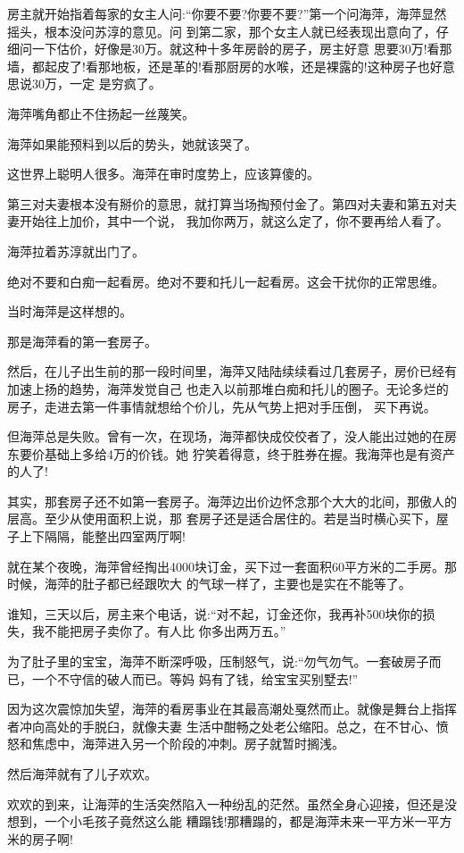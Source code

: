 \documentclass[11pt,a4paper,onecolumn]{article}
\begin{document}
房主就开始指着每家的女主人问:``你要不要?你要不要?''第一个问海萍，海萍显然摇头，根本没问苏淳的意见。问
到第二家，那个女主人就已经表现出意向了，仔细问一下估价，好像是30万。就这种十多年房龄的房子，房主好意
思要30万!看那墙，都起皮了!看那地板，还是革的!看那厨房的水喉，还是裸露的!这种房子也好意思说30万，一定
是穷疯了。

海萍嘴角都止不住扬起一丝蔑笑。

海萍如果能预料到以后的势头，她就该哭了。

这世界上聪明人很多。海萍在审时度势上，应该算傻的。

第三对夫妻根本没有掰价的意思，就打算当场掏预付金了。第四对夫妻和第五对夫妻开始往上加价，其中一个说，
我加你两万，就这么定了，你不要再给人看了。

海萍拉着苏淳就出门了。

绝对不要和白痴一起看房。绝对不要和托儿一起看房。这会干扰你的正常思维。

当时海萍是这样想的。

那是海萍看的第一套房子。

然后，在儿子出生前的那一段时间里，海萍又陆陆续续看过几套房子，房价已经有加速上扬的趋势，海萍发觉自己
也走入以前那堆白痴和托儿的圈子。无论多烂的房子，走进去第一件事情就想给个价儿，先从气势上把对手压倒，
买下再说。

但海萍总是失败。曾有一次，在现场，海萍都快成佼佼者了，没人能出过她的在房东要价基础上多给4万的价钱。她
狞笑着得意，终于胜券在握。我海萍也是有资产的人了!

其实，那套房子还不如第一套房子。海萍边出价边怀念那个大大的北间，那傲人的层高。至少从使用面积上说，那
套房子还是适合居住的。若是当时横心买下，屋子上下隔隔，能整出四室两厅啊!

就在某个夜晚，海萍曾经掏出4000块订金，买下过一套面积60平方米的二手房。那时候，海萍的肚子都已经跟吹大
的气球一样了，主要也是实在不能等了。

谁知，三天以后，房主来个电话，说:``对不起，订金还你，我再补500块你的损失，我不能把房子卖你了。有人比
你多出两万五。''

为了肚子里的宝宝，海萍不断深呼吸，压制怒气，说:``勿气勿气。一套破房子而已，一个不守信的破人而已。等妈
妈有了钱，给宝宝买别墅去!''

因为这次震惊加失望，海萍的看房事业在其最高潮处戛然而止。就像是舞台上指挥者冲向高处的手脱臼，就像夫妻
生活中酣畅之处老公缩阳。总之，在不甘心、愤怒和焦虑中，海萍进入另一个阶段的冲刺。房子就暂时搁浅。

然后海萍就有了儿子欢欢。

欢欢的到来，让海萍的生活突然陷入一种纷乱的茫然。虽然全身心迎接，但还是没想到，一个小毛孩子竟然这么能
糟蹋钱!那糟蹋的，都是海萍未来一平方米一平方米的房子啊!
\end{document}
